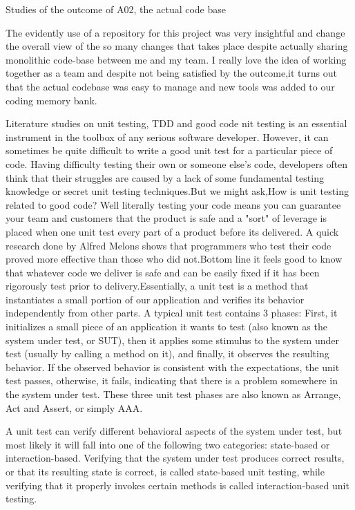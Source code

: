 \documentclass{article}
\begin{document}
{Studies of the outcome of A02, the actual code base


The evidently use of a repository for this project was very insightful and change the overall view of the so many changes that takes place despite actually sharing monolithic code-base between me and my team. I really love the idea of working together as a team and despite not being satisfied by the outcome,it turns out that the actual codebase was easy to manage and new tools was added to our coding memory bank.

Literature studies on unit testing, TDD and good code
nit testing is an essential instrument in the toolbox of any serious software developer. However, it can sometimes be quite difficult to write a good unit test for a particular piece of code. Having difficulty testing their own or someone else’s code, developers often think that their struggles are caused by a lack of some fundamental testing knowledge or secret unit testing techniques.But we might ask,How is unit testing related to good code?
Well literally testing your code means you can guarantee your team and customers that the product is safe and a "sort" of leverage is placed when one unit test every part of a product before its delivered. A quick research done by Alfred Melons shows that programmers who test their code proved more effective than those who did not.Bottom line it feels good to know that whatever code we deliver is safe and can be easily fixed if it has been rigorously test prior to delivery.Essentially, a unit test is a method that instantiates a small portion of our application and verifies its behavior independently from other parts. A typical unit test contains 3 phases: First, it initializes a small piece of an application it wants to test (also known as the system under test, or SUT), then it applies some stimulus to the system under test (usually by calling a method on it), and finally, it observes the resulting behavior. If the observed behavior is consistent with the expectations, the unit test passes, otherwise, it fails, indicating that there is a problem somewhere in the system under test. These three unit test phases are also known as Arrange, Act and Assert, or simply AAA.\cite{Sergey_unit_2017}

A unit test can verify different behavioral aspects of the system under test, but most likely it will fall into one of the following two categories: state-based or interaction-based. Verifying that the system under test produces correct results, or that its resulting state is correct, is called state-based unit testing, while verifying that it properly invokes certain methods is called interaction-based unit testing.

}
\end{document}
